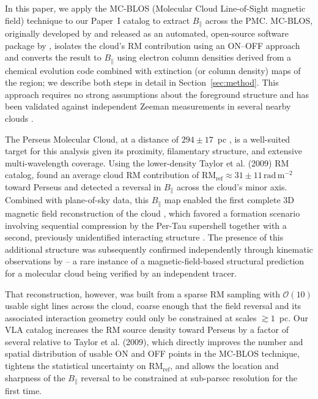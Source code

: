 \documentclass[twocolumn]{aastex631}
\begin{document}
In this paper, we apply the MC-BLOS (Molecular Cloud Line-of-Sight magnetic field) technique to our Paper~I catalog to extract $B_\parallel$ across the PMC. MC-BLOS, originally developed by \citet{tahani2018} and released as an automated, open-source software package by \citet{tahani2025mcblos}, isolates the cloud's RM contribution using an ON--OFF approach and converts the result to $B_\parallel$ using electron column densities derived from a chemical evolution code combined with extinction (or column density) maps of the region; we describe both steps in detail in Section~\ref{sec:method}. This approach requires no strong assumptions about the foreground structure and has been validated against independent Zeeman measurements in several nearby clouds \citep{tahani2018, tahani2025mcblos}.

The Perseus Molecular Cloud, at a distance of $294\pm17$~pc \citep{zucker2018}, is a well-suited target for this analysis given its proximity, filamentary structure, and extensive multi-wavelength coverage. Using the lower-density Taylor et al. (2009) RM catalog, \citet{tahani2018} found an average cloud RM contribution of $\mathrm{RM_{ref}} \approx 31 \pm 11\,\mathrm{rad\,m^{-2}}$ toward Perseus and detected a reversal in $B_\parallel$ across the cloud's minor axis. Combined with plane-of-sky data, this $B_\parallel$ map enabled the first complete 3D magnetic field reconstruction of the cloud \citep{tahani2022b}, which favored a formation scenario involving sequential compression by the Per-Tau supershell together with a second, previously unidentified interacting structure \citep[cf.][]{bialy2021}. The presence of this additional structure was subsequently confirmed independently through kinematic observations by \citet{kounkel2022} -- a rare instance of a magnetic-field-based structural prediction for a molecular cloud being verified by an independent tracer.

That reconstruction, however, was built from a sparse RM sampling with $\mathcal{O}(10)$ usable sight lines across the cloud, coarse enough that the field reversal and its associated interaction geometry could only be constrained at scales $\gtrsim 1$~pc. Our VLA catalog increases the RM source density toward Perseus by a factor of several relative to Taylor et al. (2009), which directly improves the number and spatial distribution of usable ON and OFF points in the MC-BLOS technique, tightens the statistical uncertainty on $\mathrm{RM_{ref}}$, and allows the location and sharpness of the $B_\parallel$ reversal to be constrained at sub-parsec resolution for the first time.
\end{document}
